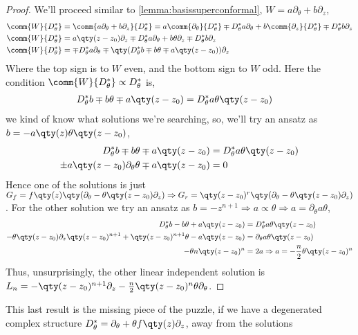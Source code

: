 \begin{proof}
    We'll proceed similar to \cref{lemma:basissuperconformal}, $W=a\partial_\theta+b\partial_z$,
    \begin{align*}
    \comm{W}{D^\ast_\theta}&=\comm{a\partial_\theta+b\partial_z}{D^\ast_\theta}=a\comm{\partial_\theta}{D^\ast_\theta}\mp D^\ast_\theta a\partial_\theta+b\comm{\partial_z}{D^\ast_\theta}\mp D^\ast_\theta b\partial_z\\
    \comm{W}{D^\ast_\theta}&=a\qty(z-z_0)\partial_z\mp D^\ast_\theta a\partial_\theta+b\theta\partial_z\mp D^\ast_\theta b\partial_z\\
    \comm{W}{D^\ast_\theta}&=\mp D^\ast_\theta a\partial_\theta\mp\qty(D^\ast_\theta b\mp b\theta\mp a\qty(z-z_0))\partial_z
\end{align*}
    Where the top sign is to $W$ even, and the bottom sign to $W$ odd. Here the condition $\comm{W}{D^\ast_\theta}\propto D^\ast_\theta$ is,
    \begin{align*}
        D^\ast_\theta b\mp b\theta\mp a \qty(z-z_0)&=D^\ast_\theta a\theta\qty(z-z_0)
    \end{align*}
    we kind of know what solutions we're searching, so, we'll try an ansatz as $b=-a\qty(z)\theta\qty(z-z_0)$,
    \begin{align*}
        D^\ast_\theta b\mp b\theta\mp a \qty(z-z_0)&=D^\ast_\theta a\theta\qty(z-z_0)\\
        \pm a\qty(z-z_0)\partial_\theta \theta\mp a \qty(z-z_0)&=0
    \end{align*}
    Hence one of the solutions is just $G_f=f\qty(z)\qty(\partial_\theta-\theta\qty(z-z_0)\partial_z)\Rightarrow G_r=\qty(z-z_0)^r\qty(\partial_\theta-\theta\qty(z-z_0)\partial_z)$. For the other solution 
    we try an ansatz as $b=-z^{n+1}\Rightarrow a\propto \theta\Rightarrow a=\partial_\theta a\theta$,
    \begin{align*}
        D^\ast_\theta b- b\theta+ a \qty(z-z_0)&=D^\ast_\theta a\theta\qty(z-z_0)\\
        -\theta\qty(z-z_0)\partial_z\qty(z-z_0)^{n+1}+ \qty(z-z_0)^{n+1}\theta- a\qty(z-z_0)&=\partial_\theta a\theta\qty(z-z_0)\\
        -\theta n\qty(z-z_0)^{n}&=2a\Rightarrow a=-\frac n2\theta\qty(z-z_0)^n
    \end{align*}
    Thus, unsurprisingly, the other linear independent solution is $L_n=-\qty(z-z_0)^{n+1}\partial_z-\frac n2 \qty(z-z_0)^n\theta\partial_\theta$.
\end{proof}
This last result is the missing piece of the puzzle, if we have a degenerated complex structure $D^\ast_\theta=\partial_\theta+\theta f\qty(z)\partial_z$, away from the solutions 
